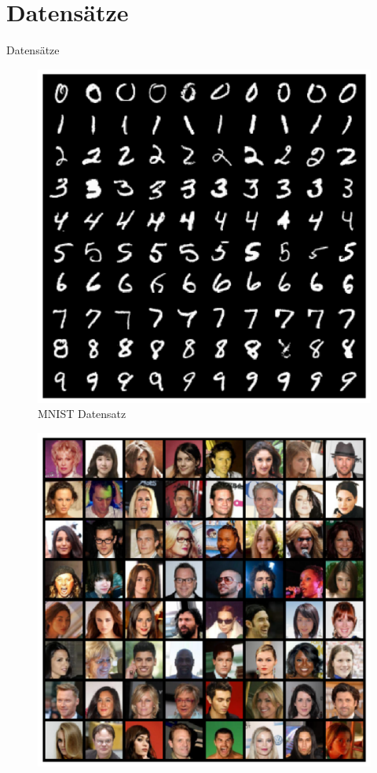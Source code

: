 \documentclass[10pt, compress]{beamer}
\begin{document}
\section{Datensätze}
\begin{frame}{Datensätze}
\begin{minipage}[c]{.45\textwidth}
  \begin{figure}[b]
  \centering
  \includegraphics[width=\textwidth]{gfx/datasets/mnist_ciffers}
  \caption{MNIST Datensatz}
  \end{figure}
\end{minipage}
\hfill
\begin{minipage}[c]{.45\textwidth}
  \begin{figure}[b]
  \centering
  \includegraphics[width=\textwidth]{gfx/datasets/real}

\end{figure}
\end{minipage}
\end{frame}
\end{document}
